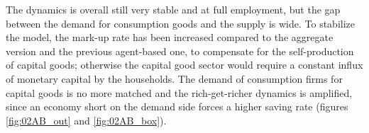 The dynamics is overall still very stable and at full employment, but the gap between the demand for consumption goods and the supply is wide. To stabilize the model, the mark-up rate has been increased compared to the aggregate version and the previous agent-based one, to compensate for the self-production of capital goods; otherwise the capital good sector would require a constant influx of monetary capital by the households. The demand of consumption firms for capital goods is no more matched and the rich-get-richer dynamics is amplified, since an economy short on the demand side forces a higher saving rate (figures \ref{fig:02AB_out} and \ref{fig:02AB_box}).
